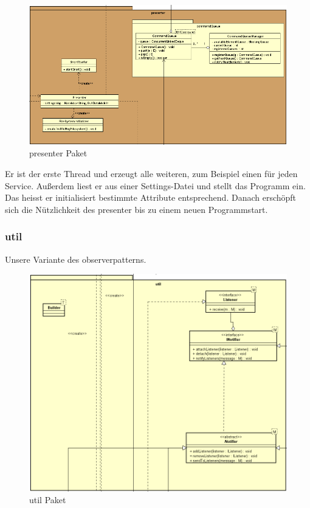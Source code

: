 \begin{figure}[H]
  \centering
  \includegraphics[width=\textwidth]{../diagramimages/presenter.png}
  \caption{presenter Paket}
\end{figure}

Er ist der erste Thread und erzeugt alle weiteren, zum Beispiel einen für jeden
Service. Außerdem liest er aus einer Settings-Datei und stellt das Programm ein.
Das heisst er initialisiert bestimmte Attribute entsprechend. Danach erschöpft
sich die Nützlichkeit des presenter bis zu einem neuen Programmstart.


\subsubsection{util}


Unsere Variante des \gls{observerpattern}s.

\begin{figure}[H]
  \centering
  \includegraphics[width=\textwidth]{../diagramimages/util.png}
  \caption{util Paket}
\end{figure}

